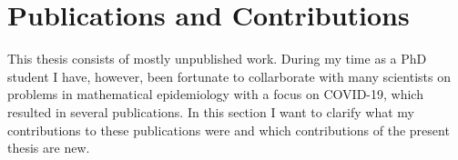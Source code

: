 
\chapter*{Publications and Contributions}

This thesis consists of mostly unpublished work. 
During my time as a PhD student I have, however, been fortunate to collarborate with many scientists on problems in mathematical epidemiology with a focus on COVID-19, which resulted in several publications.
In this section I want to clarify what my contributions to these publications were and which contributions of the present thesis are new.

\begin{refsection}[ownpubs]
    \small
    \nocite{Sherratt2022Predictive,Bracher2022National,Grundel2022How,Grundel2021How,Burgard2021Regional,Bracher2021Preregistered,Hotz2020Monitoring} 
    \printbibliography[heading=none]
\end{refsection}